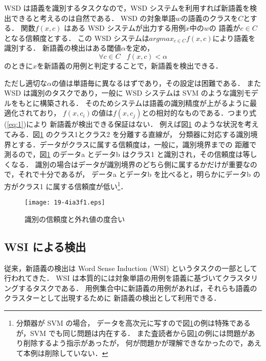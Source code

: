 \documentclass[japanese]{jnlp_1.4}
\begin{document}
WSD は語義を識別するタスクなので，WSD システムを利用すれば新語義を検出できると考えるのは自然である．
WSD の対象単語\( w \)の語義のクラスを\( C \)とする．
関数\( f(x,c) \) はある WSD システムが出力する用例\( x \)中の\( w \)の
語義が\( c \in C\)となる信頼度とする．
この WSD システムは\( argmax_{c \in C} f(x,c) \)により語義を識別する．
新語義の検出はある閾値\( \alpha \)を定め，
\begin{equation}
\forall c \in C\ \ \ \  f(x,c) < \alpha
  \label{eq:1}
\end{equation}
のときに\( x \)を新語義の用例と判定することで，新語義を検出できる．

ただし適切な\( \alpha \)の値は単語毎に異なるはずであり，その設定は困難である．
また WSD は識別のタスクであり，一般に WSD システムは SVM のような識別モデルをもとに構築される．
そのためシステムは語義の識別精度が上がるように最適化されており，
\( f(x,c_i) \)の値は\( f(x,c_j) \)との相対的なものである．つまり\mbox{式(\ref{eq:1})}により
新語義が検出できる保証はない．
例えば図\ref{fig1} のような状況を考えてみる．図\ref{fig1} のクラス1とクラス2 を分離する直線が，
分類器に対応する識別境界とする．データがクラスに属する信頼度は，一般に，識別境界までの
距離で測るので，図\ref{fig1} のデータa とデータb はクラス1 と識別され，その信頼度は等しくなる．
識別の場合はデータが識別境界のどちら側に属するかだけが重要なので，それで十分であるが，
データa とデータb を比べると，明らかにデータb の方がクラス1 に属する信頼度が低い\footnote{分類器が SVM の場合，
データを高次元に写すので図\ref{fig1}の例は特殊であるが，SVM でも同じ問題は内在する．
また査読者から図\ref{fig1}の例には問題があり削除するよう指示があったが，
何が問題かが理解できなかったので，あえて本例は削除していない．}．

\begin{figure}[t]
\begin{center}
\texttt{[image: 19-4ia3f1.eps]}
\end{center}
\caption{識別の信頼度と外れ値の度合い}
\label{fig1}
\end{figure} 


\subsection{WSI による検出}

従来，新語義の検出は Word Sense Induction (WSI) というタスクの一部として行われてきた\cite{shutze,stefan,kuoka}．
WSI は本質的には対象単語の用例を語義に基づいてクラスタリングするタスクである\cite{denkowski}．
用例集合中に新語義の用例があれば，それらも語義のクラスターとして出現するために
新語義の検出として利用できる．
\end{document}
